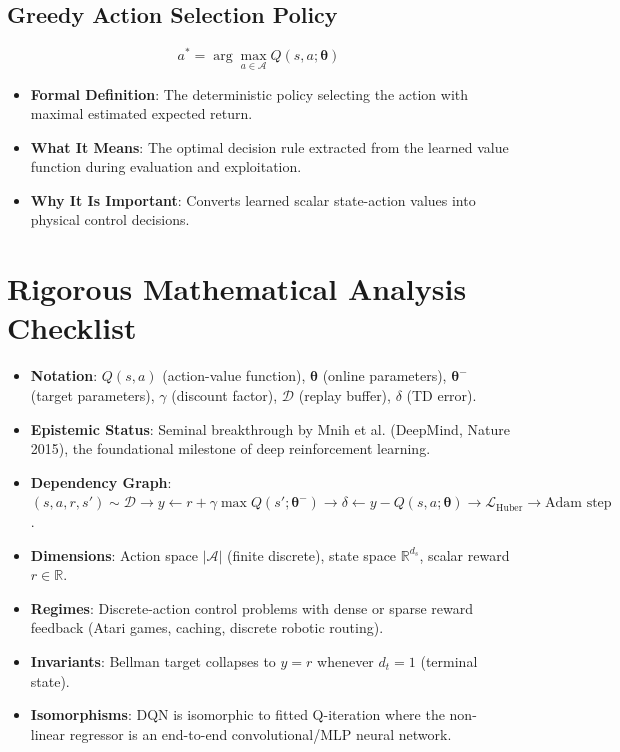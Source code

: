 \documentclass[11pt,a4paper]{article}
\theoremstyle{definition}
\begin{document}
\subsection{Greedy Action Selection Policy}
{\boldmath
\begin{equation}
a^* = \arg\max_{a \in \mathcal{A}} Q(s, a; \boldsymbol{\theta})
\end{equation}
}
\begin{itemize}
    \item \textbf{Formal Definition}: The deterministic policy selecting the action with maximal estimated expected return.
    \item \textbf{What It Means}: The optimal decision rule extracted from the learned value function during evaluation and exploitation.
    \item \textbf{Why It Is Important}: Converts learned scalar state-action values into physical control decisions.
\end{itemize}

\section{Rigorous Mathematical Analysis Checklist}

\begin{itemize}
    \item \textbf{Notation}: $Q(s, a)$ (action-value function), $\boldsymbol{\theta}$ (online parameters), $\boldsymbol{\theta}^-$ (target parameters), $\gamma$ (discount factor), $\mathcal{D}$ (replay buffer), $\delta$ (TD error).
    \item \textbf{Epistemic Status}: Seminal breakthrough by Mnih et al. (DeepMind, Nature 2015), the foundational milestone of deep reinforcement learning.
    \item \textbf{Dependency Graph}: $(s, a, r, s') \sim \mathcal{D} \to y \gets r + \gamma \max Q(s'; \boldsymbol{\theta}^-) \to \delta \gets y - Q(s, a; \boldsymbol{\theta}) \to \mathcal{L}_{\text{Huber}} \to \text{Adam step}$.
    \item \textbf{Dimensions}: Action space $|\mathcal{A}|$ (finite discrete), state space $\mathbb{R}^{d_s}$, scalar reward $r \in \mathbb{R}$.
    \item \textbf{Regimes}: Discrete-action control problems with dense or sparse reward feedback (Atari games, caching, discrete robotic routing).
    \item \textbf{Invariants}: Bellman target collapses to $y = r$ whenever $d_t = 1$ (terminal state).
    \item \textbf{Isomorphisms}: DQN is isomorphic to fitted Q-iteration where the non-linear regressor is an end-to-end convolutional/MLP neural network.
\end{itemize}
\end{document}
